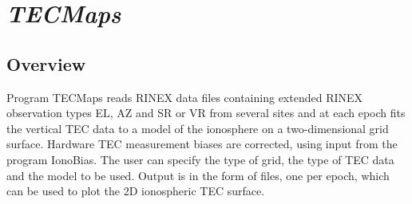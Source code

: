 %
%


\section{\emph{TECMaps}}
\subsection{Overview}
Program TECMaps reads RINEX data files containing extended RINEX observation types EL, AZ and SR or VR from several sites and at each epoch fits the vertical TEC data to a model of the ionosphere on a two-dimensional grid surface. Hardware TEC measurement biases are corrected, using input from the program IonoBias. The user can specify the type of grid, the type of TEC data and the model to be used. Output is in the form of files, one per epoch, which can be used to plot the 2D ionospheric TEC surface.
